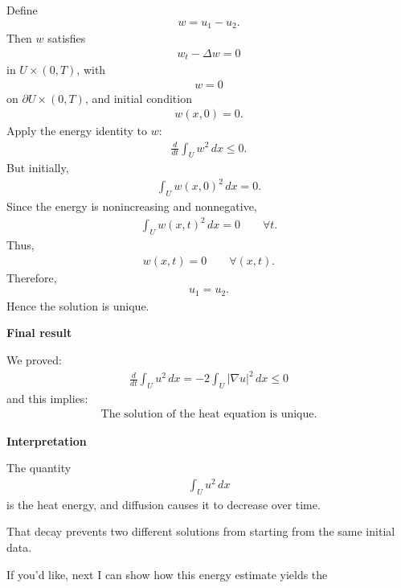 \documentclass[12pt,a4paper]{report}
\begin{document}
\begin{description}
\begin{description}
Define
\begin{align*}
w=u_1-u_2.
\end{align*}
Then $w$ satisfies
\begin{align*}
w_t-\Delta w=0
\end{align*}
in $U\times(0,T)$, with
\begin{align*}
w=0
\end{align*}
on $\partial U\times(0,T)$, and initial condition
\begin{align*}
w(x,0)=0.
\end{align*}
Apply the energy identity to $w$:
\begin{align*}
\frac{d}{dt}\int_U w^2\,dx\le 0.
\end{align*}
But initially,
\begin{align*}
\int_U w(x,0)^2\,dx=0.
\end{align*}
Since the energy is nonincreasing and nonnegative,
\begin{align*}
\int_U w(x,t)^2\,dx=0
\qquad\forall t.
\end{align*}
Thus,
\begin{align*}
w(x,t)=0
\qquad\forall (x,t).
\end{align*}
Therefore,
\begin{align*}
u_1=u_2.
\end{align*}
Hence the solution is unique.

\item \textbf{Final result}

We proved:
\begin{align*}
\boxed{
\frac{d}{dt}\int_U u^2\,dx = -2\int_U |\nabla u|^2\,dx \le 0 }
\end{align*}
and this implies:
\begin{align*}
\boxed{\text{The solution of the heat equation is unique.}}
\end{align*}

\item \textbf{Interpretation}

The quantity
\begin{align*}
\int_U u^2\,dx
\end{align*}
is the heat energy, and diffusion causes it to decrease over time.

That decay prevents two different solutions from starting from the same initial data.

\end{description}

If you'd like, next I can show how this energy estimate yields the 


\end{description}
\end{document}

